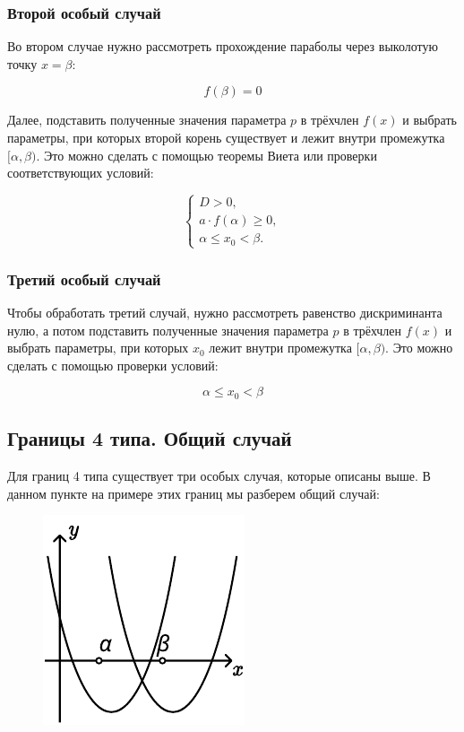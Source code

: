 \subsubsection {Второй особый случай}
Во втором случае нужно рассмотреть прохождение параболы через выколотую точку $x = \beta$:

\begin {equation*}
    f(\beta) = 0
\end {equation*}

Далее, подставить полученные значения параметра $p$ в трёхчлен $f(x)$ и выбрать параметры, при
которых второй корень существует и лежит внутри промежутка $[\alpha, \beta)$. Это можно
сделать с помощью теоремы Виета или проверки соответствующих условий:

\begin {equation*}
    \begin {cases}
        D > 0,
        \\
        a \cdot f(\alpha) \geqslant 0,
        \\
        \alpha \leqslant x_0 < \beta.
    \end {cases}
\end {equation*}

\subsubsection {Третий особый случай}

Чтобы обработать третий случай, нужно рассмотреть равенство дискриминанта нулю, а потом
подставить полученные значения параметра $p$ в трёхчлен $f(x)$ и выбрать параметры, при которых
$x_0$ лежит внутри промежутка $[\alpha, \beta)$. Это можно сделать с помощью проверки условий:

\begin {equation*}
    \alpha \leqslant x_0 < \beta
\end {equation*}

\subsection {Границы 4 типа. Общий случай}

Для границ 4 типа существует три особых случая, которые описаны выше. В данном пункте на примере
этих границ мы разберем общий случай:

\begin {figure} [h]
    \begin {minipage} [t] {\linewidth}
        \centering
        \includegraphics [width=0.3\linewidth] {images/image_05.pdf}
    \end {minipage}
\end {figure}

